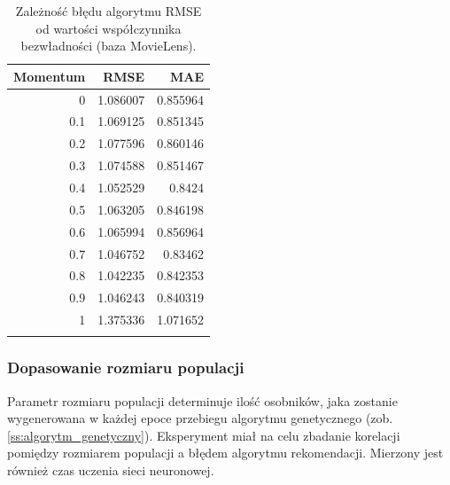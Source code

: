 \documentclass[twoside]{iisthesis}
\begin{document}
			\begin{longtable}{r||rr}
				\label{tab:expmomentum}
				\textbf{Momentum} & \textbf{RMSE} & \textbf{MAE} \\
				\hline
				0        & 1.086007 & 0.855964 \\
				0.1      & 1.069125 & 0.851345 \\
				0.2      & 1.077596 & 0.860146 \\
				0.3      & 1.074588 & 0.851467 \\
				0.4      & 1.052529 & 0.8424   \\
				0.5      & 1.063205 & 0.846198 \\
				0.6      & 1.065994 & 0.856964 \\
				0.7      & 1.046752 & 0.83462  \\
				0.8      & 1.042235 & 0.842353 \\
				0.9      & 1.046243 & 0.840319 \\
				1        & 1.375336 & 1.071652 \\
				\caption{Zależność błędu algorytmu RMSE od wartości współczynnika bezwładności (baza MovieLens).}
			\end{longtable}
						
			\subsubsection{Dopasowanie rozmiaru populacji}
		
			Parametr rozmiaru populacji determinuje ilość osobników, jaka zostanie wygenerowana w każdej epoce przebiegu algorytmu genetycznego (zob. \ref{ss:algorytm_genetyczny}). Eksperyment miał na celu zbadanie korelacji pomiędzy rozmiarem populacji a błędem algorytmu rekomendacji. Mierzony jest również czas uczenia sieci neuronowej.
			
\end{document}

